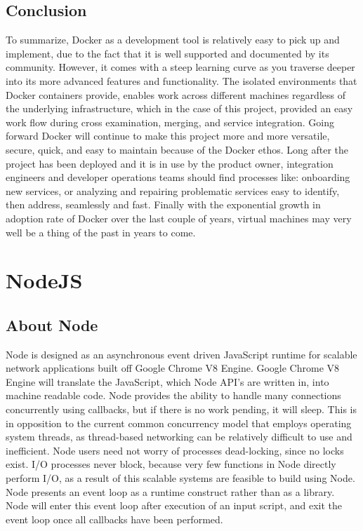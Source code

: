 \subsection{Conclusion}
	To summarize, Docker as a development tool is relatively easy to pick up and implement, due to the fact that it is well supported and documented by its community. However, it comes with a steep learning curve as you traverse deeper into its more advanced features and functionality. The isolated environments that Docker containers provide, enables work across different machines regardless of the underlying infrastructure, which in the case of this project, provided an easy work flow during cross examination, merging, and service integration. Going forward Docker will continue to make this project more and more versatile, secure, quick, and easy to maintain because of the Docker ethos. Long after the project has been deployed and it is in use by the product owner, integration engineers and developer operations teams should find processes like: onboarding new services, or analyzing and repairing problematic services easy to identify, then address, seamlessly and fast. Finally with the exponential growth in adoption rate of Docker over the last couple of years, virtual machines may very well be a thing of the past in years to come.

\section{NodeJS}
\subsection{About Node}
	Node is designed as an asynchronous event driven JavaScript runtime for scalable network applications built off Google Chrome V8 Engine. Google Chrome V8 Engine will translate the JavaScript, which Node API's are written in, into machine readable code. Node provides the ability to handle many connections concurrently using callbacks, but if there is no work pending, it will sleep\cite{nodejs}. This is in opposition to the current common concurrency model that employs operating system threads, as thread-based networking can be relatively difficult to use and inefficient. Node users need not worry of processes dead-locking, since no locks exist. I/O processes never block, because very few functions in Node directly perform I/O, as a result of this scalable systems are feasible to build using Node. Node presents an event loop as a runtime construct rather than as a library. Node will enter this event loop after execution of an input script, and exit the event loop once all callbacks have been performed\cite{nodejs}.
    
